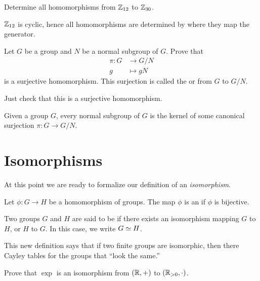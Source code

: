 \documentclass{ximera}
\begin{document}
\begin{exercise}
  Determine all homomorphisms from $\mathbb Z_{12}$ to $\mathbb Z_{30}$.
  \begin{hint}
    $\mathbb Z_{12}$ is cyclic, hence all homomorphisms are determined by
    where they map the generator.
  \end{hint}
\end{exercise}



\begin{theorem}
  Let $G$ be a group and $N$ be a normal subgroup of $G$. Prove that
  \begin{align*}
  \pi:G &\to G/N\\
  g &\mapsto gN
  \end{align*}
  is a surjective homomorphism. This surjection is called the
   or  from $G$ to
  $G/N$.
  \begin{sketch}
    Just check that this is a surjective homomorphism.
  \end{sketch}
\end{theorem}


\begin{corollary}
  Given a group $G$, every normal subgroup of $G$ is the kernel of
  some canonical surjection $\pi:G\to G/N$.
\end{corollary}




\section{Isomorphisms}

At this point we are ready to formalize our definition of an
\textit{isomorphism}.

\begin{definition}
  Let $\phi:G\to H$ be a homomorphism of groups. The map $\phi$ is an
   if $\phi$ is bijective.


  Two groups $G$ and $H$ are said to be  if
  there exists an isomorphism mapping $G$ to $H$, or $H$ to $G$.  In
  this case, we write $G\simeq H$.
\end{definition}


This new definition says that if two finite groups are isomorphic,
then there Cayley tables for the groups that ``look the same.''

\begin{exercise}
  Prove that $\exp$ is an isomorphism from $(\mathbb R,+)$ to $(\mathbb R_{>
    0},\cdot)$.
\end{exercise}
\end{document}
